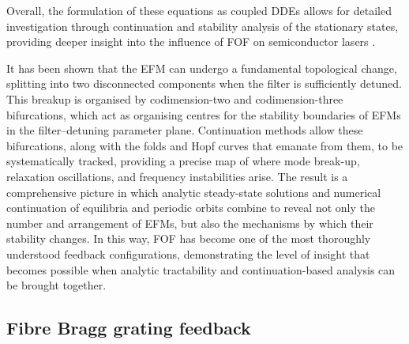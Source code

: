 Overall, the formulation of these equations as coupled DDEs allows for detailed investigation through continuation and stability analysis of the stationary states, providing deeper insight into the influence of FOF on semiconductor lasers 
\cite{erzgraber2006frequency, erzgraber2007bifurcation, erzgraber2007dynamics, fischer2000experimental, fischer2004experimental, green2006mode, 
hek2007semiconductor, erzgraber2007feedback, fischer2004filtered, yousefi2001global, yousefi2002simulations, yousefi2003nonlinear}.
%
\par
%
It has been shown that the EFM can undergo a fundamental topological change, splitting into two disconnected components when the filter is sufficiently detuned.
This breakup is organised by codimension-two and codimension-three bifurcations, which act as organising centres for the stability boundaries of EFMs in the filter–detuning parameter plane.
Continuation methods allow these bifurcations, along with the folds and Hopf curves that emanate from them, to be systematically tracked, providing a precise map of where mode break-up, relaxation oscillations, and frequency instabilities arise.
The result is a comprehensive picture in which analytic steady-state solutions and numerical continuation of equilibria and periodic orbits combine to reveal not only the number and arrangement of EFMs, but also the mechanisms by which their stability changes.
In this way, FOF has become one of the most thoroughly understood feedback configurations, demonstrating the level of insight that becomes possible when analytic tractability and continuation-based analysis can be brought together.
%
%
\subsection*{Fibre Bragg grating feedback}
\label{subsec:FBG_LK}
%
